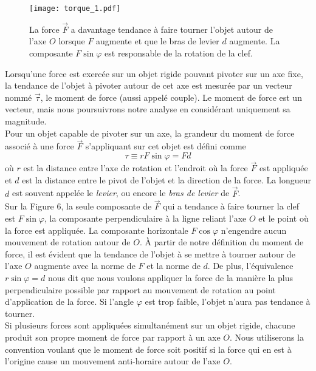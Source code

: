 \documentclass[titlepage,oneside,a4paper,11pt]{book} %
\begin{document}
\begin{wrapfigure}{r}{0.4\textwidth}
  \begin{center}
    \texttt{[image: torque\_1.pdf]}
  \end{center}
  \caption{La force $\vec{F}$ a davantage tendance à faire tourner l'objet autour de l'axe $O$ lorsque $F$ augmente et que le bras de levier $d$ augmente. La composante $F\sin\varphi$ est responsable de la rotation de la clef.}
\end{wrapfigure}

Lorsqu'une force est exercée sur un objet rigide pouvant pivoter sur un axe fixe, la tendance de l'objet à pivoter autour de cet axe est mesurée par un vecteur nommé $\vec{\tau}$, le moment de force (aussi appelé couple). Le moment de force est un vecteur, mais nous poursuivrons notre analyse en considérant uniquement sa magnitude.\\

Pour un objet capable de pivoter sur un axe, la grandeur du moment de force associé à une force $\vec{F}$ s'appliquant sur cet objet est défini comme
\begin{equation}
\tau \equiv rF\sin\varphi = Fd
\end{equation}
où $r$ est la distance entre l'axe de rotation et l'endroit où la force $\vec{F}$ est appliquée et $d$ est la distance entre le pivot de l'objet et la direction de la force. La longueur $d$ est souvent appelée le \emph{levier}, ou encore le \emph{bras de levier} de $\vec{F}$.\\

Sur la Figure 6, la seule composante de $\vec{F}$ qui a tendance à faire tourner la clef est $F\sin\varphi$, la composante perpendiculaire à la ligne reliant l'axe $O$ et le point où la force est appliquée. La composante horizontale $F\cos\varphi$ n'engendre aucun mouvement de rotation autour de $O$. À partir de notre définition du moment de force, il est évident que la tendance de l'objet à se mettre à tourner autour de l'axe $O$ augmente avec la norme de $F$ et la norme de $d$. De plus, l'équivalence $r\sin\varphi = d$ nous dit que nous voulons appliquer la force de la manière la plus perpendiculaire possible par rapport au mouvement de rotation au point d'application de la force. Si l'angle $\varphi$ est trop faible, l'objet n'aura pas tendance à tourner.\\

Si plusieurs forces sont appliquées simultanément sur un objet rigide, chacune produit son propre moment de force par rapport à un axe $O$. Nous utiliserons la convention voulant que le moment de force soit positif si la force qui en est à l'origine cause un mouvement anti-horaire autour de l'axe $O$.\\
\end{document}

